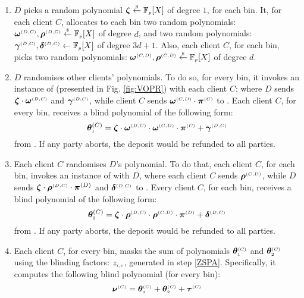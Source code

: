 \begin{enumerate}
\item  $D$ picks a  random polynomial $\bm\zeta \stackrel{\scriptscriptstyle\$}\leftarrow \mathbb{F}_{\scriptscriptstyle p}[X]$ of degree $1$, for each bin.  
It, for each client $C$, allocates to each bin two random polynomials: $\bm\omega^{\scriptscriptstyle(D,C)}, \bm\rho^{\scriptscriptstyle (D,C)}\stackrel{\scriptscriptstyle\$}\leftarrow \mathbb{F}_{\scriptscriptstyle p}[X]$ of degree $d$, and  two  random polynomials: $\bm\gamma^{\scriptscriptstyle (D,C)}, \bm\delta^{\scriptscriptstyle (D,C)} \leftarrow \mathbb{F}_{\scriptscriptstyle p}[X]$ of degree $3d+1$. Also, each client $C$, for each bin, picks two  random polynomials: $\bm\omega^{\scriptscriptstyle (C,D)}, \bm\rho^{\scriptscriptstyle (C,D)}\stackrel{\scriptscriptstyle\$}\leftarrow \mathbb{F}_{\scriptscriptstyle p}[X]$ of degree $d$. %




\item\label{e-psi::D-randomises}  $D$ randomises other clients' polynomials. To do so, for every bin, it invokes an instance of {\vopr} (presented in Fig. \ref{fig:VOPR}) with  each client $  C$; where  $D$ sends $\bm\zeta \cdot \bm\omega^{\scriptscriptstyle  {  {(D,C)}}}$ and $\bm\gamma^{\scriptscriptstyle  {  {(D,C)}}}$, while client $ C$ sends $\bm\omega^{\scriptscriptstyle  {  {(C,D)}}}\cdot \bm\pi^{\scriptscriptstyle  {  {(C)}}}$ to {\vopr}. Each client $    {  C}$, for every bin, receives a blind polynomial of the following form: 
%
$$\bm\theta^{  {  {(C)}}}_{\scriptscriptstyle 1}=\bm\zeta \cdot \bm\omega^{\scriptscriptstyle  {  {(D,C)}}}\cdot \bm\omega^{\scriptscriptstyle  {  {(C,D)}}}\cdot \bm\pi^{\scriptscriptstyle  {  {(C)}}}+\bm\gamma^{\scriptscriptstyle  {  {(D,C)}}}$$
%
 from {\vopr}. If any party aborts, the deposit would be refunded to all parties.

\item\label{e-psi::C-randomises} Each client $    {  C}$ randomises  $ {D}$'s polynomial. To do that, each client $    {  C}$, for each bin,  invokes an instance of {\vopr} with   $ {D}$,    where each client $    {  C}$  sends $\bm\rho^{\scriptscriptstyle  {  {(C,D)}}}$, while  ${D}$  sends $\bm\zeta\cdot\bm \rho^{\scriptscriptstyle  {  {(D,C)}}}\cdot \bm\pi^{  {  {(D)}}}$ and $\bm\delta^{\scriptscriptstyle  {  {(D,C)}}}$ to {\vopr}. Every client   $    {  C}$, for each bin,  receives a blind polynomial of the following form: 
$$\bm\theta^{  {  {(C)}}}_{\scriptscriptstyle 2}=\bm\zeta \cdot \bm\rho^{\scriptscriptstyle  {  {(D,C)}}}\cdot \bm\rho^{\scriptscriptstyle  {  {(C,D)}}}\cdot \bm\pi^{\scriptscriptstyle  {  {(D)}}}+\bm\delta^{\scriptscriptstyle  {  {(D,C)}}}$$
 from {\vopr}. If any party aborts, the deposit would be refunded to all parties.


\item\label{blindPoly-C-sends-to-contract} Each client $ C$, for every bin, masks the sum of polynomials $\bm\theta^{\scriptscriptstyle  {  {(C)}}}_{\scriptscriptstyle 1}$ and $\bm\theta^{\scriptscriptstyle  {  {(C)}}}_{\scriptscriptstyle 2}$  using the blinding factors: $z_{\scriptscriptstyle i,c}$, generated in step \ref{ZSPA}. Specifically, it computes the following blind polynomial (for every bin):  
$$\bm\nu^{ \scriptscriptstyle {  {(C)}} }= \bm\theta^{ \scriptscriptstyle {  {(C)}}}_{\scriptscriptstyle 1}+\bm\theta^{\scriptscriptstyle  {  {(C)}}}_{\scriptscriptstyle 2}+\bm \tau^{\scriptscriptstyle  {  {(C)}} }$$


\end{enumerate}
